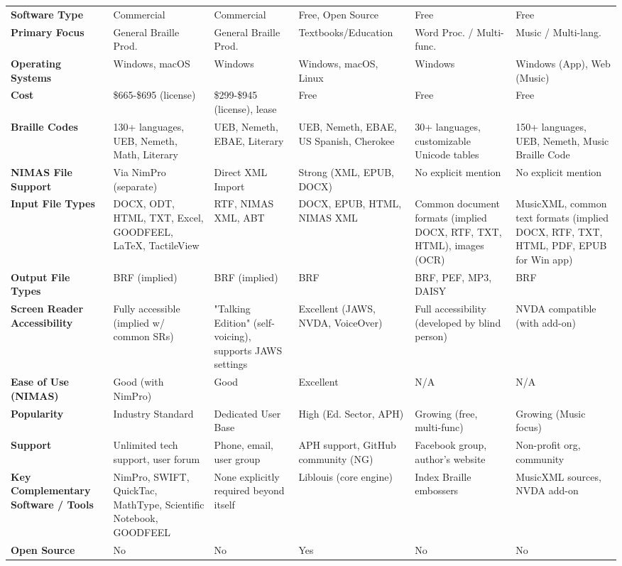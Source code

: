 \begin{longtable}{|p{2.5cm}|p{2cm}|p{2cm}|p{2.5cm}|p{2.5cm}|p{2.5cm}|}
\textbf{Software Type} & Commercial & Commercial & Free, Open Source & Free & Free \\
\textbf{Primary Focus} & General Braille Prod. & General Braille Prod. & Textbooks/Education & Word Proc. / Multi-func. & Music / Multi-lang. \\
\textbf{Operating Systems} & Windows, macOS & Windows & Windows, macOS, Linux & Windows & Windows (App), Web (Music) \\
\textbf{Cost} & \$665-\$695 (license) & \$299-\$945 (license), lease & Free & Free & Free \\
\textbf{Braille Codes} & 130+ languages, UEB, Nemeth, Math, Literary & UEB, Nemeth, EBAE, Literary & UEB, Nemeth, EBAE, US Spanish, Cherokee & 30+ languages, customizable Unicode tables & 150+ languages, UEB, Nemeth, Music Braille Code \\
\textbf{NIMAS File Support} & Via NimPro (separate) & Direct XML Import & Strong (XML, EPUB, DOCX) & No explicit mention & No explicit mention \\
\textbf{Input File Types} & DOCX, ODT, HTML, TXT, Excel, GOODFEEL, LaTeX, TactileView & RTF, NIMAS XML, ABT & DOCX, EPUB, HTML, NIMAS XML & Common document formats (implied DOCX, RTF, TXT, HTML), images (OCR) & MusicXML, common text formats (implied DOCX, RTF, TXT, HTML, PDF, EPUB for Win app) \\
\textbf{Output File Types} & BRF (implied) & BRF (implied) & BRF & BRF, PEF, MP3, DAISY & BRF \\
\textbf{Screen Reader Accessibility} & Fully accessible (implied w/ common SRs) & "Talking Edition" (self-voicing), supports JAWS settings & Excellent (JAWS, NVDA, VoiceOver) & Full accessibility (developed by blind person) & NVDA compatible (with add-on) \\
\textbf{Ease of Use (NIMAS)} & Good (with NimPro) & Good & Excellent & N/A & N/A \\
\textbf{Popularity} & Industry Standard & Dedicated User Base & High (Ed. Sector, APH) & Growing (free, multi-func) & Growing (Music focus) \\
\textbf{Support} & Unlimited tech support, user forum & Phone, email, user group & APH support, GitHub community (NG) & Facebook group, author's website & Non-profit org, community \\
\textbf{Key Complementary Software / Tools} & NimPro, SWIFT, QuickTac, MathType, Scientific Notebook, GOODFEEL & None explicitly required beyond itself & Liblouis (core engine) & Index Braille embossers & MusicXML sources, NVDA add-on \\
\textbf{Open Source} & No & No & Yes & No & No \\
\hline
\end{longtable}

